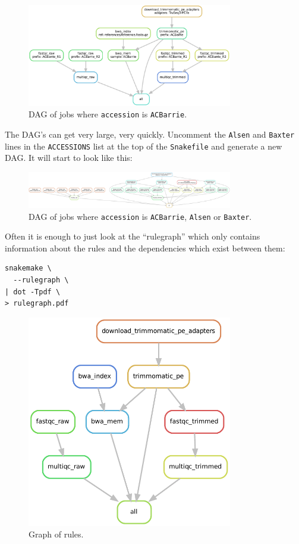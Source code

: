 \begin{figure}[H]
\centering
\includegraphics[width=0.8\textwidth]{handout/dag.pdf}
\caption{DAG of jobs where \texttt{accession} is \texttt{ACBarrie}.}
\label{fig:dag}
\end{figure}

The DAG's can get very large, very quickly. Uncomment the \texttt{Alsen} and \texttt{Baxter} lines in the \texttt{ACCESSIONS} list at the top of the
\texttt{Snakefile} and generate a new DAG. It will start to look like this:

\begin{figure}[H]
\centering
\includegraphics[width=0.8\textwidth]{handout/dag_bigger.pdf}
\caption{DAG of jobs where \texttt{accession} is \texttt{ACBarrie}, \texttt{Alsen} or \texttt{Baxter}.}
\label{fig:dag_bigger}
\end{figure}

Often it is enough to just look at the ``rulegraph'' which only contains information about the rules and the dependencies which exist between them:

\begin{lstlisting}
snakemake \
  --rulegraph \
| dot -Tpdf \
> rulegraph.pdf
\end{lstlisting}

\begin{figure}[H]
\centering
\includegraphics[width=0.8\textwidth]{handout/rulegraph.pdf}
\caption{Graph of rules.}
\label{fig:rulegraph}
\end{figure}


